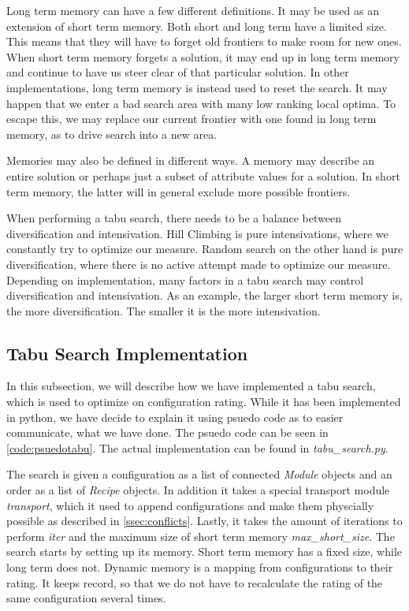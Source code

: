 Long term memory can have a few different definitions. It may be used as an extension of short term memory. Both short and long term have a limited size. This means that they will have to forget old frontiers to make room for new ones. When short term memory forgets a solution, it may end up in long term memory and continue to have us steer clear of that particular solution. In other implementations, long term memory is instead used to reset the search. It may happen that we enter a bad search area with many low ranking local optima. To escape this, we may replace our current frontier with one found in long term memory, as to drive search into a new area.

Memories may also be defined in different ways. A memory may describe an entire solution or perhaps just a subset of attribute values for a solution. In short term memory, the latter will in general exclude more possible frontiers. 

When performing a tabu search, there needs to be a balance between diversification and intensivation. Hill Climbing is pure intensivations, where we constantly try to optimize our measure. Random search on the other hand is pure diversification, where there is no active attempt made to optimize our measure. Depending on implementation, many factors in a tabu search may control diversification and intensivation. As an example, the larger short term memory is, the more diversification. The smaller it is the more intensivation.


\subsection{Tabu Search Implementation}
In this subsection, we will describe how we have implemented a tabu search, which is used to optimize on configuration rating. While it has been implemented in python, we have decide to explain it using psuedo code as to easier communicate, what we have done. The psuedo code can be seen in \cref{code:psuedotabu}. The actual implementation can be found in  \textit{tabu\_search.py}. 



The search is given a configuration as a list of connected \textit{Module} objects and an order as a list of \textit{Recipe} objects. In addition it takes a special transport module \textit{transport}, which it used to append configurations and make them physcially possible as described in \cref{ssec:conflicts}. Lastly, it takes the amount of iterations to perform \textit{iter} and the maximum size of short term memory \textit{max\_short\_size}. The search starts by setting up its memory. Short term memory has a fixed size, while long term does not. Dynamic memory is a mapping from configurations to their rating. It keeps record, so that we do not have to recalculate the rating of the same configuration several times. 

